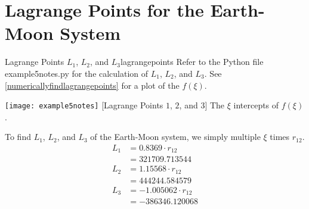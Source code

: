 \hypersetup{pageanchor = false}
\section{Lagrange Points for the Earth-Moon System}
\label{lagr-points-earth}

\begin{examples}{Lagrange Points \(L_1\), \(L_2\), and \(L_3\)}{lagrangepoints}
  Refer to the Python file example5notes.py for the calculation of \(L_1\),
  \(L_2\), and \(L_3\).
  See \cref{numericallyfindlagrangepoints} for a plot of the \(f(\xi)\).
  \par\smallskip
  \begin{minipage}{\linewidth}
    \centering
    \texttt{[image: example5notes]}
    [Lagrange Points \(1\), \(2\), and \(3\)]
    {The \(\xi\) intercepts of \(f(\xi)\).}
    \label{numericallyfindlagrangepoints}
  \end{minipage}
  \par\smallskip
  To find \(L_1\), \(L_2\), and \(L_3\) of the Earth-Moon system, we simply
  multiple \(\xi\) times \(r_{12}\).
  \begin{align*} 
    L_1 & = 0.8369\cdot r_{12}\\
        & = 321709.713544\\
    L_2 & = 1.15568\cdot r_{12}\\
        & = 444244.584579\\
    L_3 & = -1.005062\cdot r_{12}\\
        & = -386346.120068
  \end{align*}
\end{examples}
